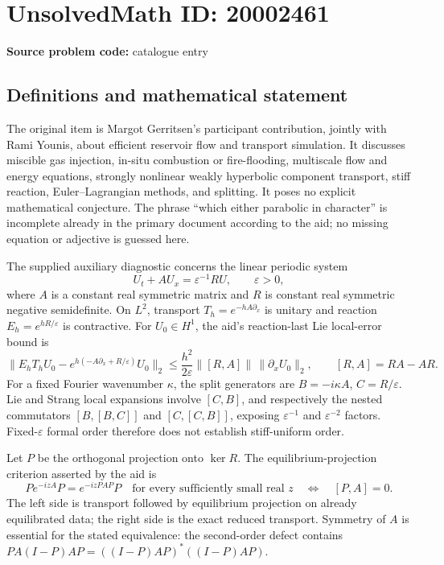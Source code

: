 \documentclass[11pt]{article}
\begin{document}
\section*{UnsolvedMath ID: 20002461}
\textbf{Source problem code:} catalogue entry
\subsection{Definitions and mathematical statement}
The original item is Margot Gerritsen's participant contribution, jointly with Rami Younis, about efficient reservoir flow and transport simulation. It discusses miscible gas injection, in-situ combustion or fire-flooding, multiscale flow and energy equations, strongly nonlinear weakly hyperbolic component transport, stiff reaction, Euler--Lagrangian methods, and splitting. It poses no explicit mathematical conjecture. The phrase ``which either parabolic in character'' is incomplete already in the primary document according to the aid; no missing equation or adjective is guessed here.

The supplied auxiliary diagnostic concerns the linear periodic system
\[
 U_t+A U_x=\varepsilon^{-1}RU,\qquad\varepsilon>0,
\]
where \(A\) is a constant real symmetric matrix and \(R\) is constant real symmetric negative semidefinite. On \(L^2\), transport \(T_h=e^{-hA\partial_x}\) is unitary and reaction \(E_h=e^{hR/\varepsilon}\) is contractive. For \(U_0\in H^1\), the aid's reaction-last Lie local-error bound is
\[
 \|E_hT_hU_0-e^{h(-A\partial_x+R/\varepsilon)}U_0\|_2
 \le\frac{h^2}{2\varepsilon}\|[R,A]\|\,\|\partial_xU_0\|_2,
 \qquad[R,A]=RA-AR.
\]
For a fixed Fourier wavenumber \(\kappa\), the split generators are \(B=-i\kappa A\), \(C=R/\varepsilon\). Lie and Strang local expansions involve \([C,B]\), and respectively the nested commutators \([B,[B,C]]\) and \([C,[C,B]]\), exposing \(\varepsilon^{-1}\) and \(\varepsilon^{-2}\) factors. Fixed-\(\varepsilon\) formal order therefore does not establish stiff-uniform order.

Let \(P\) be the orthogonal projection onto \(\ker R\). The equilibrium-projection criterion asserted by the aid is
\[
 P e^{-izA}P=e^{-izPAP}P\quad\text{for every sufficiently small real }z
 \quad\Longleftrightarrow\quad[P,A]=0.
\]
The left side is transport followed by equilibrium projection on already equilibrated data; the right side is the exact reduced transport. Symmetry of \(A\) is essential for the stated equivalence: the second-order defect contains \(PA(I-P)AP=((I-P)AP)^*((I-P)AP)\).
\end{document}
